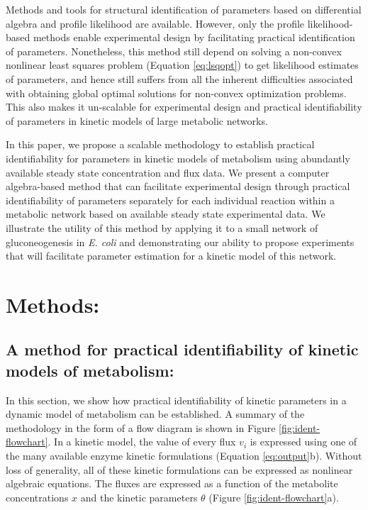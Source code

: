 \documentclass[10pt]{article}
\begin{document}
Methods and tools for structural identification of parameters based on differential algebra \parencite{Ljung1994, Audoly2001, Bellu2007} and profile likelihood \parencite{Raue2009a} are available. However, only the profile likelihood-based methods enable experimental design by facilitating practical identification of parameters. Nonetheless, this method still depend on solving a non-convex nonlinear least squares problem (Equation \ref{eq:lsqopt}) to get likelihood estimates of parameters, and hence still suffers from all the inherent difficulties associated with obtaining global optimal solutions for non-convex optimization problems. This also makes it un-scalable for experimental design and practical identifiability of parameters in kinetic models of large metabolic networks.

In this paper, we propose a scalable methodology to establish practical identifiability for parameters in kinetic models of metabolism using abundantly available steady state concentration and flux data. We present a computer algebra-based method that can facilitate experimental design through practical identifiability of parameters separately for each individual reaction within a metabolic network based on available steady state experimental data. We illustrate the utility of this method by applying it to a small network of gluconeogenesis in \textit{E. coli} and demonstrating our ability to propose experiments that will facilitate parameter estimation for a kinetic model of this network. %

\section{Methods:}	
\subsection{A method for practical identifiability of kinetic models of metabolism:}\label{sec:ident}
In this section, we show how practical identifiability of kinetic parameters in a dynamic model of metabolism can be established. A summary of the methodology in the form of a flow diagram is shown in Figure \ref{fig:ident-flowchart}. In a kinetic model, the value of every flux $v_i$ is expressed using one of the many available enzyme kinetic formulations (Equation \ref{eq:output}b). Without loss of generality, all of these kinetic formulations can be expressed as nonlinear algebraic equations. The fluxes are expressed as a function of the metabolite concentrations $x$ and the kinetic parameters $\theta$ (Figure \ref{fig:ident-flowchart}a). 
\end{document}
